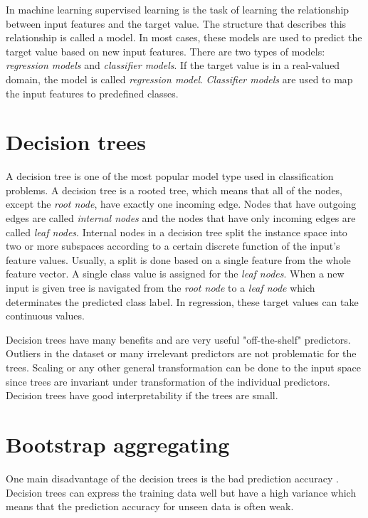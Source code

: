 In machine learning supervised learning is the task of learning the relationship between input features and the target value. The structure that describes this relationship is called a model. In most cases, these models are used to predict the target value based on new input features. There are two types of models: \textit{regression models} and \textit{classifier models}. If the target value is in a real-valued domain, the model is called \textit{regression model}. \textit{Classifier models} are used to map the input features to predefined classes. \cite{rokach2005top}

\section{Decision trees}
A decision tree is one of the most popular model type used in classification problems. A decision tree is a rooted tree, which means that all of the nodes, except the \textit{root node}, have exactly one incoming edge. Nodes that have outgoing edges are called \textit{internal nodes} and the nodes that have only incoming edges are called \textit{leaf nodes}. Internal nodes in a decision tree split the instance space into two or more subspaces according to a certain discrete function of the input's feature values. Usually, a split is done based on a single feature from the whole feature vector. A single class value is assigned for the \textit{leaf nodes}. When a new input is given tree is navigated from the \textit{root node} to a \textit{leaf node} which determinates the predicted class label. In regression, these target values can take continuous values. \cite{rokach2005top}

Decision trees have many benefits and are very useful "off-the-shelf" predictors. Outliers in the dataset or many irrelevant predictors are not problematic for the trees. Scaling or any other general transformation can be done to the input space since trees are invariant under transformation of the individual predictors. \cite{friedman2001elements} Decision trees have good interpretability if the trees are small.

\section{Bootstrap aggregating}
One main disadvantage of the decision trees is the bad prediction accuracy \cite{friedman2001elements}. Decision trees can express the training data well but have a high variance which means that the prediction accuracy for unseen data is often weak.

